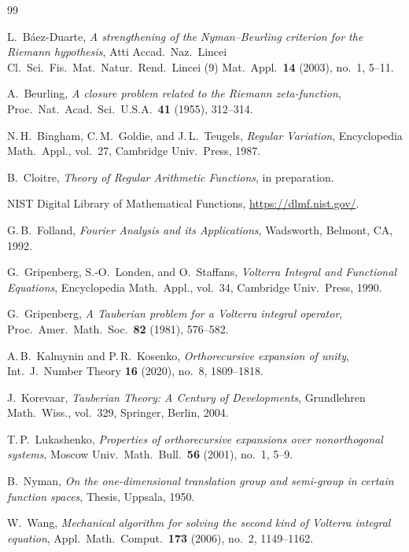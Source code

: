 \documentclass[11pt]{amsart}
\theoremstyle{definition}
\theoremstyle{remark}
\begin{document}
\begin{thebibliography}{99}

L.~B\'aez-Duarte, \textit{A strengthening of the Nyman--Beurling criterion for the Riemann hypothesis}, Atti Accad.\ Naz.\ Lincei Cl.\ Sci.\ Fis.\ Mat.\ Natur.\ Rend.\ Lincei (9) Mat.\ Appl.\ \textbf{14} (2003), no.~1, 5--11.

A.~Beurling, \textit{A closure problem related to the Riemann zeta-function}, Proc.\ Nat.\ Acad.\ Sci.\ U.S.A.\ \textbf{41} (1955), 312--314.

N.\,H.~Bingham, C.\,M.~Goldie, and J.\,L.~Teugels, \textit{Regular Variation}, Encyclopedia Math.\ Appl., vol.~27, Cambridge Univ.\ Press, 1987.

B.~Cloitre, \textit{Theory of Regular Arithmetic Functions}, in preparation.

NIST Digital Library of Mathematical Functions, \url{https://dlmf.nist.gov/}.

G.\,B.~Folland, \textit{Fourier Analysis and its Applications}, Wadsworth, Belmont, CA, 1992.

G.~Gripenberg, S.-O.~Londen, and O.~Staffans, \textit{Volterra Integral and Functional Equations}, Encyclopedia Math.\ Appl., vol.~34, Cambridge Univ.\ Press, 1990.

G.~Gripenberg, \textit{A Tauberian problem for a Volterra integral operator}, Proc.\ Amer.\ Math.\ Soc.\ \textbf{82} (1981), 576--582.

A.\,B.~Kalmynin and P.\,R.~Kosenko, \textit{Orthorecursive expansion of unity}, Int.\ J.\ Number Theory \textbf{16} (2020), no.~8, 1809--1818.

J.~Korevaar, \textit{Tauberian Theory: A Century of Developments}, Grundlehren Math.\ Wiss., vol.~329, Springer, Berlin, 2004.

T.\,P.~Lukashenko, \textit{Properties of orthorecursive expansions over nonorthogonal systems}, Moscow Univ.\ Math.\ Bull.\ \textbf{56} (2001), no.~1, 5--9.

B.~Nyman, \textit{On the one-dimensional translation group and semi-group in certain function spaces}, Thesis, Uppsala, 1950.

W.~Wang, \textit{Mechanical algorithm for solving the second kind of Volterra integral equation}, Appl.\ Math.\ Comput.\ \textbf{173} (2006), no.~2, 1149--1162.

\end{thebibliography}
\end{document}
